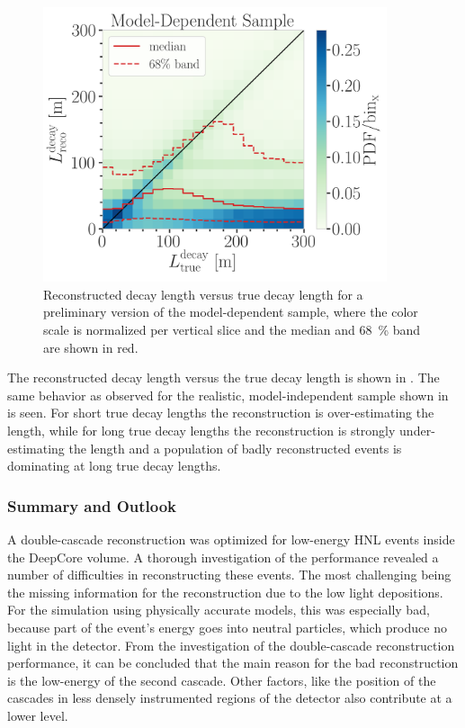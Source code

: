 \begin{figure}[h]
    \includegraphics[width=0.9\textwidth]{figures/results/190607/resolutions/reco_decayL_vs_true_decayL_final_level_good_step_contours.png}
    \caption[Reconstructed decay length resolution versus true decay length - preliminary model-dependent sample]{Reconstructed decay length versus true decay length for a preliminary version of the model-dependent sample, where the color scale is normalized per vertical slice and the median and \SI{68}{\percent} band are shown in red.}
\end{figure}
The reconstructed decay length versus the true decay length is shown in . The same behavior as observed for the realistic, model-independent sample shown in  is seen. For short true decay lengths the reconstruction is over-estimating the length, while for long true decay lengths the reconstruction is strongly under-estimating the length and a population of badly reconstructed events is dominating at long true decay lengths.


\subsubsection{Summary and Outlook}

A double-cascade reconstruction was optimized for low-energy HNL events inside the DeepCore volume. A thorough investigation of the performance revealed a number of difficulties in reconstructing these events. The most challenging being the missing information for the reconstruction due to the low light depositions. For the simulation using physically accurate models, this was especially bad, because part of the event's energy goes into neutral particles, which produce no light in the detector. From the investigation of the double-cascade reconstruction performance, it can be concluded that the main reason for the bad reconstruction is the low-energy of the second cascade. Other factors, like the position of the cascades in less densely instrumented regions of the detector also contribute at a lower level.

